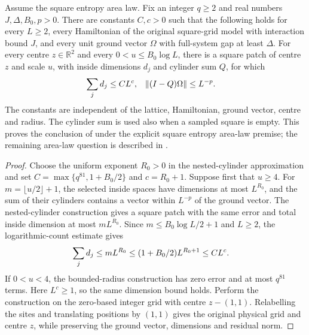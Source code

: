 \begin{theorem}
    \label{thm:peps_adaptive_patch_constraint_of_area_law}
    Assume the square entropy area law. Fix an integer $q\ge2$ and
    real numbers $J,\Delta,B_0,p>0$. There are constants $C,c>0$ such that
    the following holds for every $L\ge2$, every Hamiltonian of the original
    square-grid model with interaction bound $J$, and every unit ground vector
    $\Omega$ with full-system gap at least $\Delta$.
    For every centre $z\in\mathbb R^2$ and every $0<u\le B_0\log L$, there
    is a square patch of centre $z$ and scale $u$, with inside dimensions
    $d_j$ and cylinder sum $Q$, for which
    \begin{align}
        \sum_j d_j & \le CL^c, & \|(I-Q)\Omega\| & \le L^{-p}. \notag
    \end{align}
    The constants are independent of the lattice, Hamiltonian, ground vector,
    centre and radius. The cylinder sum is used also when a sampled square
    is empty. This proves the conclusion of
    \cite[Proposition~4.1]{OpenAI2026PolynomialPEPS} under the explicit square
    entropy area-law premise; the remaining area-law question is described in
    \cite{gap:arealaw2d_rectangular_specialization_scope}.
\end{theorem}
\begin{proof}
    Choose the uniform exponent $R_0>0$ in the nested-cylinder approximation
    and set $C=\max\{q^{81},1+B_0/2\}$ and $c=R_0+1$.
    Suppose first that $u\ge4$. For $m=\lfloor u/2\rfloor+1$, the selected
    inside spaces have dimensions at most $L^{R_0}$, and the sum of their cylinders
    contains a vector within $L^{-p}$ of the ground vector.
    The nested-cylinder construction gives a square patch with the same
    error and total inside dimension at most $mL^{R_0}$.
    Since $m\le B_0\log L/2+1$ and $L\ge2$, the logarithmic-count estimate gives
    \begin{align}
        \sum_j d_j & \le mL^{R_0}
        \le (1+B_0/2)L^{R_0+1}\le CL^c. \notag
    \end{align}
    If $0<u<4$, the bounded-radius construction has zero error and at most
    $q^{81}$ terms. Here $L^c\ge1$, so the same dimension bound holds.
    Perform the construction on the zero-based integer grid with centre
    $z-(1,1)$. Relabelling the sites and translating positions by $(1,1)$
    gives the original physical grid and centre $z$, while preserving the
    ground vector, dimensions and residual norm.
\end{proof}
